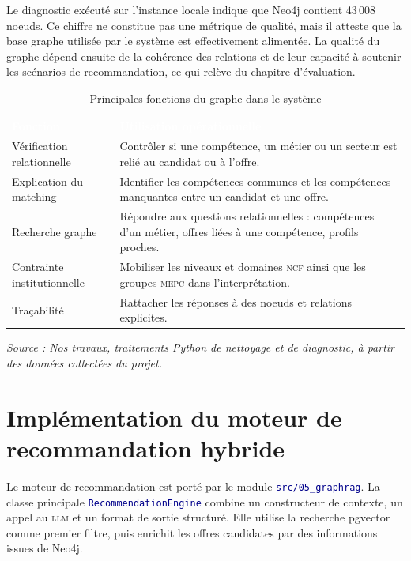 \documentclass[12pt,twoside]{report}
\newcommand{\source}[1]{%
  \par\vspace{0.2\baselineskip}
  {\centering\footnotesize\itshape Source : #1\par}
}
\newcommand{\filevar}[1]{\texttt{\textcolor{darkblue}{#1}}}
\newcommand{\tabheader}[1]{\textcolor{white}{\textbf{#1}}}
\newcommand{\tableStyleStart}{%
  \small
  \renewcommand{\arraystretch}{1.12}%
  \setlength{\tabcolsep}{4pt}%
  \rowcolors{2}{lightblue!12}{white}%
}
\newcommand{\tableStyleEnd}{%
  \rowcolors{2}{}{}%
  \renewcommand{\arraystretch}{1}%
}
\newcommand{\MEPC}{\textsc{mepc}}
\newcommand{\NCF}{\textsc{ncf}}
\newcommand{\LLM}{\textsc{llm}}
\begin{document}
Le diagnostic exécuté sur l'instance locale indique que Neo4j contient 43\,008 noeuds. Ce chiffre ne constitue pas une métrique de qualité, mais il atteste que la base graphe utilisée par le système est effectivement alimentée. La qualité du graphe dépend ensuite de la cohérence des relations et de leur capacité à soutenir les scénarios de recommandation, ce qui relève du chapitre d'évaluation.

\begin{table}[H]
  \centering
  \caption{Principales fonctions du graphe dans le système}
  \label{tab:roles_neo4j_chap3}
  \tableStyleStart
  \begin{tabularx}{\textwidth}{p{4.2cm}X}
    \rowcolor{darkblue}
    \tabheader{Fonction} & \tabheader{Utilisation opérationnelle} \\
    \midrule
    Vérification relationnelle & Contrôler si une compétence, un métier ou un secteur est relié au candidat ou à l'offre. \\
    Explication du matching & Identifier les compétences communes et les compétences manquantes entre un candidat et une offre. \\
    Recherche graphe & Répondre aux questions relationnelles : compétences d'un métier, offres liées à une compétence, profils proches. \\
    Contrainte institutionnelle & Mobiliser les niveaux et domaines \NCF{} ainsi que les groupes \MEPC{} dans l'interprétation. \\
    Traçabilité & Rattacher les réponses à des noeuds et relations explicites. \\
    \bottomrule
  \end{tabularx}
  \tableStyleEnd
  \source{Nos travaux, traitements Python de nettoyage et de diagnostic, à partir des données collectées du projet.}
\end{table}

\section{Implémentation du moteur de recommandation hybride}

Le moteur de recommandation est porté par le module \filevar{src/05\_graphrag}. La classe principale \filevar{RecommendationEngine} combine un constructeur de contexte, un appel au \LLM{} et un format de sortie structuré. Elle utilise la recherche pgvector comme premier filtre, puis enrichit les offres candidates par des informations issues de Neo4j.
\end{document}
